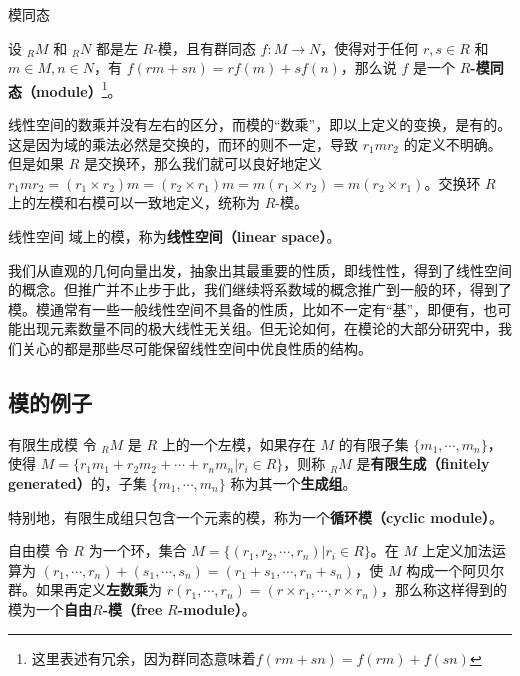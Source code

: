\begin{definition}{模同态}

设 $_RM$ 和 $_RN$ 都是左 $R$-模，且有群同态 $f:M\to N$，使得对于任何 $r, s\in R$ 和 $m\in M, n\in N$，有 $f(rm+sn)=rf(m)+sf(n)$，那么说 $f$ 是一个 $R$\textbf{-模同态（module）}\footnote{这里表述有冗余，因为群同态意味着$f(rm+sn)=f(rm)+f(sn)$}。

\end{definition}



线性空间的数乘并没有左右的区分，而模的“数乘”，即以上定义的变换，是有的。这是因为域的乘法必然是交换的，而环的则不一定，导致 $r_1mr_2$ 的定义不明确。但是如果 $R$ 是交换环，那么我们就可以良好地定义 $r_1mr_2=(r_1\times r_2)m=(r_2\times r_1)m=m(r_1\times r_2)=m(r_2\times r_1)$。交换环 $R$ 上的左模和右模可以一致地定义，统称为 $R$-模。

\begin{definition}{线性空间}
域上的模，称为\textbf{线性空间（linear space）}。
\end{definition}


我们从直观的几何向量出发，抽象出其最重要的性质，即线性性，得到了线性空间的概念。但推广并不止步于此，我们继续将系数域的概念推广到一般的环，得到了模。模通常有一些一般线性空间不具备的性质，比如不一定有“基”，即便有，也可能出现元素数量不同的极大线性无关组。但无论如何，在模论的大部分研究中，我们关心的都是那些尽可能保留线性空间中优良性质的结构。



\subsection{模的例子}


\begin{definition}{有限生成模}
令 $_RM$ 是 $R$ 上的一个左模，如果存在 $M$ 的有限子集 $\{m_1, \cdots, m_n\}$，使得 $M=\{r_1m_1+r_2m_2+\cdots+r_nm_n|r_i\in R\}$，则称 $_RM$ 是\textbf{有限生成（finitely generated）}的，子集 $\{m_1, \cdots, m_n\}$ 称为其一个\textbf{生成组}。

特别地，有限生成组只包含一个元素的模，称为一个\textbf{循环模（cyclic module）}。
\end{definition}


\begin{definition}{自由模}
令 $R$ 为一个环，集合 $M=\{(r_1, r_2, \cdots, r_n)|r_i\in R\}$。在 $M$ 上定义加法运算为 $(r_1, \cdots, r_n)+(s_1, \cdots, s_n)=(r_1+s_1, \cdots, r_n+s_n)$，使 $M$ 构成一个阿贝尔群。如果再定义\textbf{左数乘}为 $r(r_1, \cdots, r_n)=(r\times r_1, \cdots, r\times r_n)$，那么称这样得到的模为一个\textbf{自由}$R$\textbf{-模（free} $R$\textbf{-module）}。
\end{definition}







